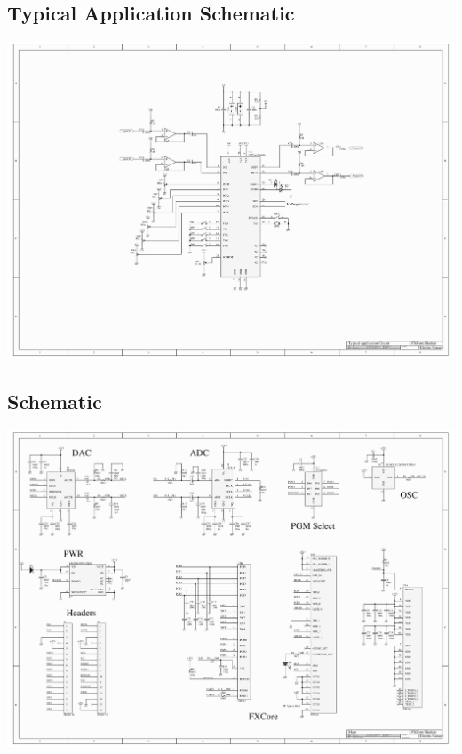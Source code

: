 \documentclass[a4paper, 10pt]{article}
\begin{document}
\begin{landscape}
\section{Typical Application Schematic}
\begin{center}
\includegraphics[scale = 0.7]{TypicalAppSch.pdf}
\end{center}
\end{landscape}
\newpage

\begin{landscape}
\section{Schematic}
\begin{center}
\includegraphics[scale = 0.7]{Schematic.pdf}
\end{center}
\end{landscape}
\newpage
\end{document}
